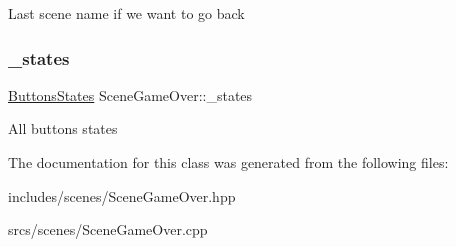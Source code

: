 Last scene name if we want to go back \mbox{\label{class_scene_game_over_a59d3b330db3d8eafcd8b1d1a2b44a845}} 
\subsubsection{\texorpdfstring{\+\_\+states}{\_states}}
{\footnotesize\ttfamily \hyperlink{struct_scene_game_over_1_1_buttons_states}{Buttons\+States} Scene\+Game\+Over\+::\+\_\+states\hspace{0.3cm}{\ttfamily [protected]}}

All buttons states 

The documentation for this class was generated from the following files\+:\begin{DoxyCompactItemize}
\item 
includes/scenes/Scene\+Game\+Over.\+hpp\item 
srcs/scenes/Scene\+Game\+Over.\+cpp\end{DoxyCompactItemize}
